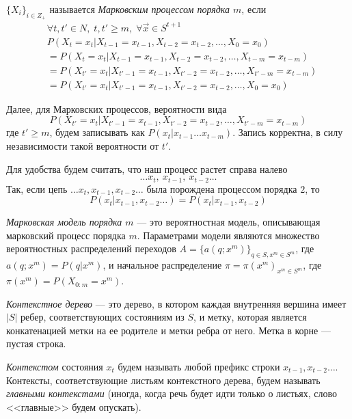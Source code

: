 \documentclass{matmex-diploma-custom}
\begin{document}
\begin{definition} $ \{X_{i}\}_{i \in Z_{+}}$ называется \emph{Марковским процессом порядка $ m $}, если  
\begin{align}
&\forall t, t'\in N, \;t, t' \geq m,\; \forall \overrightarrow{x} \in S^{t+1}\nonumber
\\&P(X_{t} = x_{t}|X_{t-1}=x_{t-1},X_{t-2}=x_{t-2}, \ldots ,X_{0}=x_{0}) \nonumber
\\&=P(X_{t} = x_{t}|X_{t-1}=x_{t-1},X_{t-2}=x_{t-2}, \ldots ,X_{t-m}=x_{t-m})\nonumber
\\&=P(X_{t'} = x_{t}|X_{t'-1}=x_{t-1},X_{t'-2}=x_{t-2}, \ldots ,X_{t'-m}=x_{t-m})\nonumber
\\&=P(X_{t'} = x_{t}|X_{t'-1}=x_{t-1},X_{t'-2}=x_{t-2}, \ldots ,X_{0}=x_{0}) 
\end{align}
\label{MP}
\end{definition}
Далее, для Марковских процессов, вероятности вида  
$$P(X_{t'} = x_{t}|X_{t'-1}=x_{t-1},X_{t'-2}=x_{t-2}, \ldots ,X_{t'-m}=x_{t-m})$$ где $t'\geq m$, 
будем записывать как $P(x_{t} |x_{t-1}\ldots x_{t-m})$. Запись корректна, в силу независимости такой вероятности от $t'$.

Для удобства будем считать, что наш процесс растет справа налево  
$$\ldots x_{t},~ x_{t-1},~ x_{t-2} \ldots$$
Так,  если цепь $\ldots x_{t}, x_{t-1}, x_{t-2} \ldots$ была порождена процессом порядка $2$,
то $$P(x_{t}| x_{t-1},x_{t-2}\ldots) = P(x_{t}|x_{t-1},x_{t-2})$$

\begin{definition} \emph{Марковская модель порядка $ m $} --- это вероятностная модель, описывающая марковский процесс порядка $m$. Параметрами модели являются множество вероятностных распределений переходов  $ A = \{a(q; x^{m})\}_{q \in S, x^{m} \in S^{m}}$, где $a(q; x^{m}) = P(q|x^{m})$, и начальное распределение $\pi = \pi(x^m)_{x^m \in S^m}$, где $\pi(x^m) = P(X_{0:m}=x^m)$.
\end{definition}

\begin{definition}
\textit{Контекстное дерево} --- это дерево, в котором каждая внутренняя вершина имеет $ |S| $ ребер, соответствующих состояниям из $S$, и метку, которая является конкатенацией метки на ее родителе и метки ребра от него. Метка в корне --- пустая строка. 
\end{definition}
\textit{Контекстом} состояния $ x_{t} $  будем называть любой префикс строки  $x_{t-1}, x_{t-2} \ldots$.
Контексты, соответствующие листьям контекстного дерева, будем называть \textit{главными контекстами} (иногда, когда речь будет идти только о листьях, слово <<главные>> будем опускать).
\end{document}
